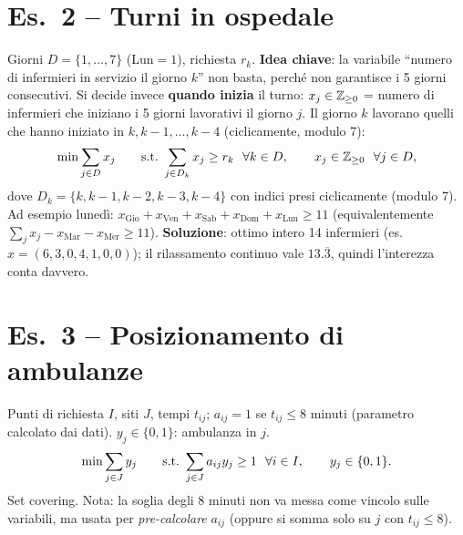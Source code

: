 \section*{Es.\ 2 -- Turni in ospedale}
Giorni $D=\{1,\dots,7\}$ (Lun$=1$), richiesta $r_k$.
\textbf{Idea chiave}: la variabile ``numero di infermieri in servizio il giorno $k$'' non basta, perché non garantisce i 5 giorni consecutivi. Si decide invece \textbf{quando inizia} il turno:
$x_j\in\mathbb{Z}_{\ge0}$ = numero di infermieri che iniziano i 5 giorni lavorativi il giorno $j$.
Il giorno $k$ lavorano quelli che hanno iniziato in $k,k-1,\dots,k-4$ (ciclicamente, modulo 7):
\[ \min\sum_{j\in D}x_j\qquad\text{s.t.}\ \sum_{j\in D_k}x_j\ge r_k\ \ \forall k\in D,\qquad x_j\in\mathbb{Z}_{\ge0}\ \ \forall j\in D, \]
dove $D_k=\{k,k-1,k-2,k-3,k-4\}$ con indici presi ciclicamente (modulo 7).
Ad esempio lunedì: $x_{\text{Gio}}+x_{\text{Ven}}+x_{\text{Sab}}+x_{\text{Dom}}+x_{\text{Lun}}\ge11$ (equivalentemente $\sum_jx_j-x_{\text{Mar}}-x_{\text{Mer}}\ge 11$).
\textbf{Soluzione}: ottimo intero 14 infermieri (es.\ $x=(6,3,0,4,1,0,0)$); il rilassamento continuo vale $13.\overline3$, quindi l'interezza conta davvero.

\section*{Es.\ 3 -- Posizionamento di ambulanze}
Punti di richiesta $I$, siti $J$, tempi $t_{ij}$; $a_{ij}=1$ se $t_{ij}\le8$ minuti (parametro calcolato dai dati). $y_j\in\{0,1\}$: ambulanza in $j$.
\[ \min\sum_{j\in J}y_j\qquad\text{s.t.}\ \sum_{j\in J}a_{ij}y_j\ge1\ \ \forall i\in I,\qquad y_j\in\{0,1\}. \]
Set covering. Nota: la soglia degli 8 minuti non va messa come vincolo sulle variabili, ma usata per \emph{pre-calcolare} $a_{ij}$ (oppure si somma solo su $j$ con $t_{ij}\le 8$).

